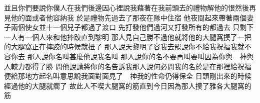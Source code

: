 並且你們要說\chientien 你僕人在我們後邊\yuentien 因心裡說\chientien 我藉著在我前頭去的禮物解他的恨\chientien 然後再見他的面\chientien 或者他容納我\chuan 
{}於是禮物先過去了\yuentien 那夜在隊中住宿\chuan\Chuan
{}他夜間起來\chientien 帶著兩個妻子\chientien 兩個使女\chientien 並十一個兒子都過了渡口\chuan 
{}先打發他們過河\chientien 又打發所有的都過去\yuentien 
{}只剩下一人\yuentien 有一個人來和他摔跤\chientien 直到黎明\chuan 
{}那人見自己勝不過他\chientien 就將他的大腿窩摸了一把\chientien{}的大腿窩\chientien 正在摔跤的時候就扭了\chuan 
{}那人說\chientien 天黎明了\chientien 容我去罷\yuentien{}說\chientien 你不給我祝福\chientien 我就不容你去\chuan 
{}那人說\chientien 你名叫甚麼\chientien 他說\chientien 我名叫\chuan 
{}那人說\chientien 你的名不要再叫\chientien 要叫\chientien 因為你與　神與人較力\chientien 都得了勝\chuan 
{}問他說\chientien 請將你的名告訴我\yuentien 那人說\chientien 何必問我的名\yuentien 於是在那裡給祝福\chuan 
{}便給那地方起名叫\chuan{}意思說\chientien 我面對面見了　神\chientien 我的性命仍得保全\chuan 
{}日頭剛出來的時候\chientien{}經過\chientien 他的大腿就瘸了\chuan 
{}故此人不喫大腿窩的筋\chientien 直到今日\chientien 因為那人摸了雅各大腿窩的筋\chuan 
